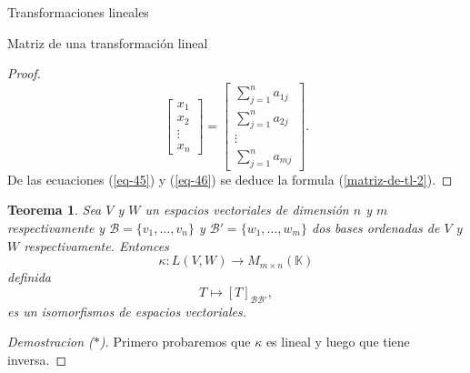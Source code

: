 \documentclass[a4paper,12pt,twoside,spanish,reqno]{amsbook}
\newtheorem{teorema}{Teorema}[section]
\theoremstyle{definition}
\theoremstyle{remark}
\newcommand{\K}{\mathbb K}
\begin{document}
\begin{chapter}{Transformaciones lineales}
\begin{section}{Matriz de una transformación lineal}
\begin{proof}
\begin{equation}
            \begin{bmatrix} x_1\\x_2\\ \vdots\\x_n\end{bmatrix}
            =
            \begin{bmatrix}  \sum_{j=1}^{n}a_{1j}\\\sum_{j=1}^{n}a_{2j}\\ \vdots\\\sum_{j=1}^{n}a_{mj}\end{bmatrix}.
            \end{equation}
            De las ecuaciones (\ref{eq-45}) y (\ref{eq-46}) se deduce la formula (\ref{matriz-de-tl-2}).
        \end{proof}
        
        \begin{teorema}
            Sea $V$  y $W$ un espacios vectoriales de dimensión $n$ y $m$ respectivamente y $\mathcal B = \{v_1,\ldots,v_n\}$ y $\mathcal B' = \{w_1,\ldots,w_m\}$ dos bases  ordenadas de $V$ y $W$ respectivamente. Entonces 
            $$
            \kappa: L(V,W) \to M_{m \times n}(\K)
            $$
            definida
            $$
            T \mapsto [T]_{\mathcal B \mathcal B'},
            $$
            es un isomorfismos de espacios vectoriales. 
        \end{teorema}
        \begin{proof}[Demostracion ($*$)]
            Primero probaremos que $\kappa$  es lineal y luego que tiene inversa.
            

\end{proof}
\end{section}
\end{chapter}
\end{document}

